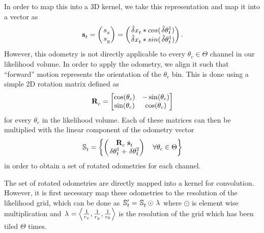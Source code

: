 \documentclass[letterpaper, 10 pt, conference]{ieeeconf}  %
\begin{document}
In order to map this into a 3D kernel, we take this representation and map it into a vector as
\begin{equation}
\vtr{}{}{S}{t}{}=
\begin{pmatrix}
\sca{}{}{s}{x}{} \\
\sca{}{}{s}{y}{}  
\end{pmatrix}
=
\begin{pmatrix}
\sca{}{}{\hat{\delta} x}{t}{} * cos(\sca{}{}{\hat{\delta}\theta}{t}{1}) \\
\sca{}{}{\hat{\delta} x}{t}{} * sin(\sca{}{}{\hat{\delta}\theta}{t}{1}) 
\end{pmatrix}.
\end{equation}
However, this odometry is not directly applicable to every \ensuremath{\theta_c \in \Theta} channel in our likelihood volume.
In order to apply the odometry, we align it such that ``forward'' motion represents the orientation of the \ensuremath{\theta_c} bin.
This is done using a simple 2D rotation matrix defined as
\begin{equation}
\mat{}{}{R}{c}{} = 
\begin{bmatrix}
\cos(\theta_c) & -\sin(\theta_c) \\
\sin(\theta_c) & \cos(\theta_c) \\
\end{bmatrix}
\end{equation}
for  every \ensuremath{\theta_c} in the likelihood volume.
Each of these matrices can then be multiplied with the linear component of the odometry vector
\begin{equation}
\set{}{}{S}{t}{} = \mybra{
\begin{pmatrix}
\mat{}{}{R}{c}{}\vtr{}{}{S}{t}{} \\
\sca{}{}{\delta\theta}{t}{1} + \sca{}{}{\delta\theta}{t}{2}
\end{pmatrix}
\quad \forall \theta_c \in \Theta}
\end{equation}
in order to obtain a set of rotated odometries for each channel.

The set of rotated odometries are directly mapped into a kernel for convolution.
However, it is first necessary map these odometries to the resolution of the likelihood grid, which can be done as
\ensuremath{
\set{}{}{S}{t}{\prime}= \set{}{}{S}{t}{} \odot \vtr{}{}{\lambda}{}{}
}
where \ensuremath{\odot} is element wise multiplication and \ensuremath{\vtr{}{}{\lambda}{}{} = \mytuple{\frac{1}{r_x}, \frac{1}{r_y}, \frac{1}{r_\theta}}} is the resolution of the grid which has been tiled \ensuremath{\Theta} times.
\end{document}
